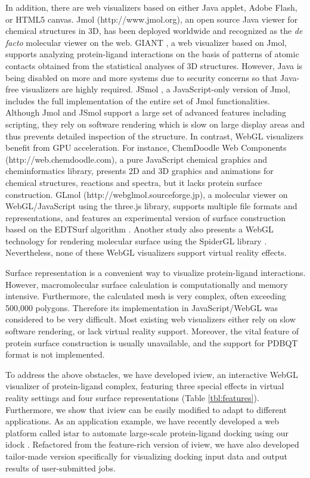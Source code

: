 \documentclass{article}
\begin{document}
\begin{multicols}{2}
In addition, there are web visualizers based on either Java applet, Adobe Flash, or HTML5 canvas. Jmol (http://www.jmol.org), an open source Java viewer for chemical structures in 3D, has been deployed worldwide and recognized as the \textit{de facto} molecular viewer on the web. GIANT \cite{1359}, a web visualizer based on Jmol, supports analyzing protein-ligand interactions on the basis of patterns of atomic contacts obtained from the statistical analyses of 3D structures. However, Java is being disabled on more and more systems due to security concerns so that Java-free visualizers are highly required. JSmol \cite{1314}, a JavaScript-only version of Jmol, includes the full implementation of the entire set of Jmol functionalities. Although Jmol and JSmol support a large set of advanced features including scripting, they rely on software rendering which is slow on large display areas and thus prevents detailed inspection of the structure. In contrast, WebGL visualizers benefit from GPU acceleration. For instance, ChemDoodle Web Components (http://web.chemdoodle.com), a pure JavaScript chemical graphics and cheminformatics library, presents 2D and 3D graphics and animations for chemical structures, reactions and spectra, but it lacks protein surface construction. GLmol (http://webglmol.sourceforge.jp), a molecular viewer on WebGL/JavaScript using the three.js library, supports multiple file formats and representations, and features an experimental version of surface construction based on the EDTSurf algorithm \cite{1297,1350}. Another study \cite{1262} also presents a WebGL technology for rendering molecular surface using the SpiderGL library \cite{1320}. Nevertheless, none of these WebGL visualizers support virtual reality effects.

Surface representation is a convenient way to visualize protein-ligand interactions. However, macromolecular surface calculation is computationally and memory intensive. Furthermore, the calculated mesh is very complex, often exceeding 500,000 polygons. Therefore its implementation in JavaScript/WebGL was considered to be very difficult. Most existing web visualizers either rely on slow software rendering, or lack virtual reality support. Moreover, the vital feature of protein surface construction is usually unavailable, and the support for PDBQT format is not implemented.

To address the above obstacles, we have developed iview, an interactive WebGL visualizer of protein-ligand complex, featuring three special effects in virtual reality settings and four surface representations (Table \ref{tbl:features}). Furthermore, we show that iview can be easily modified to adapt to different applications. As an application example, we have recently developed a web platform called istar \cite{1362} to automate large-scale protein-ligand docking using our idock \cite{1153}. Refactored from the feature-rich version of iview, we have also developed tailor-made version specifically for visualizing docking input data and output results of user-submitted jobs.


\end{multicols}
\end{document}
